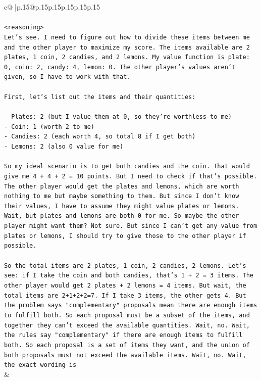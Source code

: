 \documentclass{article}
\begin{document}
{\begin{supertabular}{c@{$\;$}|p{.15\linewidth}@{}p{.15\linewidth}p{.15\linewidth}p{.15\linewidth}p{.15\linewidth}p{.15\linewidth}}
{{{\\ 
\\ 
\texttt{<reasoning>} \\
\texttt{Let's see. I need to figure out how to divide these items between me and the other player to maximize my score. The items available are 2 plates, 1 coin, 2 candies, and 2 lemons. My value function is plate: 0, coin: 2, candy: 4, lemon: 0. The other player's values aren't given, so I have to work with that.} \\
\\ 
\texttt{First, let's list out the items and their quantities:} \\
\\ 
\texttt{{-} Plates: 2 (but I value them at 0, so they're worthless to me)} \\
\texttt{{-} Coin: 1 (worth 2 to me)} \\
\texttt{{-} Candies: 2 (each worth 4, so total 8 if I get both)} \\
\texttt{{-} Lemons: 2 (also 0 value for me)} \\
\\ 
\texttt{So my ideal scenario is to get both candies and the coin. That would give me 4 + 4 + 2 = 10 points. But I need to check if that's possible. The other player would get the plates and lemons, which are worth nothing to me but maybe something to them. But since I don't know their values, I have to assume they might value plates or lemons. Wait, but plates and lemons are both 0 for me. So maybe the other player might want them? Not sure. But since I can't get any value from plates or lemons, I should try to give those to the other player if possible.} \\
\\ 
\texttt{So the total items are 2 plates, 1 coin, 2 candies, 2 lemons. Let's see: if I take the coin and both candies, that's 1 + 2 = 3 items. The other player would get 2 plates + 2 lemons = 4 items. But wait, the total items are 2+1+2+2=7. If I take 3 items, the other gets 4. But the problem says "complementary" proposals mean there are enough items to fulfill both. So each proposal must be a subset of the items, and together they can't exceed the available quantities. Wait, no. Wait, the rules say "complementary" if there are enough items to fulfill both. So each proposal is a set of items they want, and the union of both proposals must not exceed the available items. Wait, no. Wait, the exact wording is} \\
            }
        }
    }
    & \\ \\


\end{supertabular}}
\end{document}
